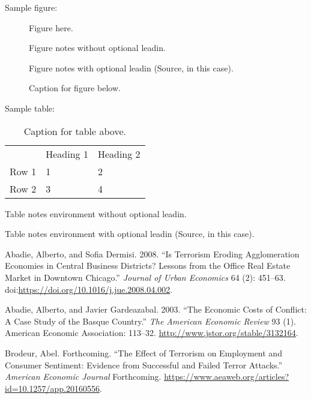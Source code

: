 \documentclass[]{AEA}
\begin{document}
Sample figure:

\begin{figure}
Figure here.

\caption{Caption for figure below.}
\begin{figurenotes}
Figure notes without optional leadin.
\end{figurenotes}
\begin{figurenotes}[Source]
Figure notes with optional leadin (Source, in this case).
\end{figurenotes}
\end{figure}

Sample table:

\begin{table}
\caption{Caption for table above.}

\begin{tabular}{lll}
& Heading 1 & Heading 2 \\
Row 1 & 1 & 2 \\
Row 2 & 3 & 4%
\end{tabular}
\begin{tablenotes}
Table notes environment without optional leadin.
\end{tablenotes}
\begin{tablenotes}[Source]
Table notes environment with optional leadin (Source, in this case).
\end{tablenotes}
\end{table}



\appendix

\hypertarget{refs}{}
\hypertarget{ref-ABADIE2008451}{}
Abadie, Alberto, and Sofia Dermisi. 2008. ``Is Terrorism Eroding
Agglomeration Economies in Central Business Districts? Lessons from the
Office Real Estate Market in Downtown Chicago.'' \emph{Journal of Urban
Economics} 64 (2): 451--63.
doi:\href{https://doi.org/https://doi.org/10.1016/j.jue.2008.04.002}{https://doi.org/10.1016/j.jue.2008.04.002}.

\hypertarget{ref-10.2307ux2f3132164}{}
Abadie, Alberto, and Javier Gardeazabal. 2003. ``The Economic Costs of
Conflict: A Case Study of the Basque Country.'' \emph{The American
Economic Review} 93 (1). American Economic Association: 113--32.
\url{http://www.jstor.org/stable/3132164}.

\hypertarget{ref-B_forthcoming}{}
Brodeur, Abel. Forthcoming. ``The Effect of Terrorism on Employment and
Consumer Sentiment: Evidence from Successful and Failed Terror
Attacks.'' \emph{American Economic Journal} Forthcoming.
\url{https://www.aeaweb.org/articles?id=10.1257/app.20160556}.
\end{document}
